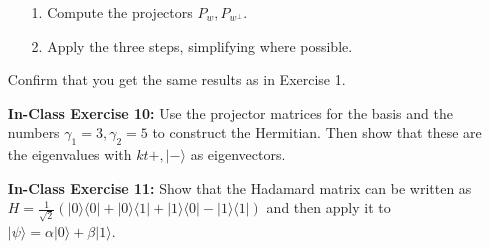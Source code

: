 \documentclass[main.tex]{subfiles}
\begin{document}
\begin{enumerate}
    \begin{enumerate}
        \item[1.] Compute the projectors $P_{w}, P_{w^{\perp}}$.
        \item[2.] Apply the three steps, simplifying where possible.
    \end{enumerate}
    
    Confirm that you get the same results as in Exercise 1.

\item[] \textbf{In-Class Exercise 10:} Use the projector matrices for the basis and the numbers $\gamma_{1}=3, \gamma_{2}=5$ to construct the Hermitian. Then show that these are the eigenvalues with $k t+,|-\rangle$ as eigenvectors.

\item[] \textbf{In-Class Exercise 11:} Show that the Hadamard matrix can be written as $H=\frac{1}{\sqrt{2}}(|0\rangle\langle 0|+| 0\rangle\langle 1|+| 1\rangle\langle 0|-| 1\rangle\langle 1|)$ and then apply it to $|\psi\rangle=\alpha|0\rangle+\beta|1\rangle$.

\end{enumerate}
\end{document}
